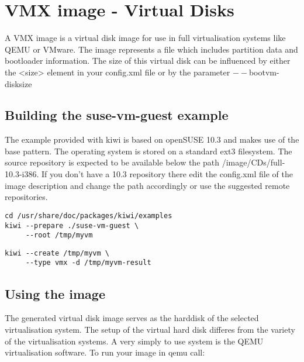 \chapter{VMX image - Virtual Disks}
\label{chapter:vmx}
\minitoc

A VMX image is a virtual disk image for use in full virtualisation
systems like QEMU or VMware. The image represents a file which
includes partition data and bootloader information. The size of
this virtual disk can be influenced by either the <size> element
in your config.xml file or by the parameter $--$bootvm-disksize

\section{Building the suse-vm-guest example}

The example provided with kiwi is based on openSUSE 10.3 and makes use
of the base pattern. The operating system is stored on a
standard ext3 filesystem. The source repository is expected to be
available below the path /image/CDs/full-10.3-i386. If you don't have
a 10.3 repository there edit the config.xml file of the image description
and change the path accordingly or use the suggested remote repositories.

\begin{Command}{12cm}
\begin{verbatim}
cd /usr/share/doc/packages/kiwi/examples
kiwi --prepare ./suse-vm-guest \
     --root /tmp/myvm
\end{verbatim}
\end{Command}

\begin{Command}{12cm}
\begin{verbatim}
kiwi --create /tmp/myvm \
     --type vmx -d /tmp/myvm-result
\end{verbatim}
\end{Command}

\section{Using the image}

The generated virtual disk image serves as the harddisk of the selected
virtualisation system. The setup of the virtual hard disk differes from
the variety of the virtualisation systems. A very simply to use system
is the QEMU virtualisation software. To run your image in qemu call:

